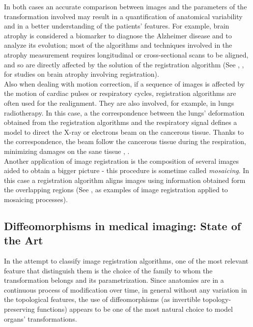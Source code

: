 In both cases an accurate comparison between images and the parameters of the transformation involved may result in a quantification of anatomical variability and in a better understanding of the patients' features. 
%
For example, brain atrophy is considered a biomarker to diagnose the Alzheimer disease and to analyze its evolution; most of the algorithms and techniques involved in the atrophy measurement requires longitudinal or cross-sectional scans to be aligned, and so are directly affected by the solution of the registration algorithm (See \cite{fox1997brain}, \cite{gauthier2012prevention}, \cite{prados2015measuring} for studies on brain atrophy involving registration). \\

Also when dealing with motion correction, if a sequence of images is affected by the motion of cardiac pulses or respiratory cycles, registration algorithms are often used for the realignment. 
They are also involved, for example, in lungs radiotherapy. In this case, a the correspondence between the lungs' deformation obtained from the registration algorithms and the respiratory signal defines a model to direct the X-ray or electrons beam on the cancerous tissue. Thanks to the correspondence, the beam follow the cancerous tissue during the respiration, minimizing damages on the sane tissue \cite{mcclelland}, \cite{mcclelland2011inter}.\\

Another application of image registration is the composition of several images aided to obtain a bigger picture - this procedure is sometime called \emph{mosaicing}. In this case a registration algorithm aligns images using information obtained form the overlapping regions (See \cite{vercauteren2006robust}, \cite{szeliski1994image} as examples of image registration applied to mosaicing processes).

\subsection{Diffeomorphisms in medical imaging: State of the Art}

In the attempt to classify image registration algorithms, one of the most relevant feature that distinguish them is the choice of the family to whom the transformation belongs and its parametrization. Since anatomies are in a continuous process of modification over time, in general without any variation in the topological features, the use of diffeomorphisms (as invertible topology-preserving functions) appears to be one of the most natural choice to model organs' transformations.\\


